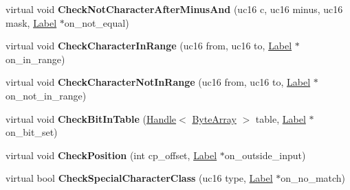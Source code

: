 \begin{DoxyCompactItemize}
\item 
virtual void {\bfseries Check\+Not\+Character\+After\+Minus\+And} (uc16 c, uc16 minus, uc16 mask, \hyperlink{classv8_1_1internal_1_1_label}{Label} $\ast$on\+\_\+not\+\_\+equal)\hypertarget{classv8_1_1internal_1_1_reg_exp_macro_assembler_a_r_m64_a5cee9315b3959c1247ef4aa32a30f36b}{}\label{classv8_1_1internal_1_1_reg_exp_macro_assembler_a_r_m64_a5cee9315b3959c1247ef4aa32a30f36b}

\item 
virtual void {\bfseries Check\+Character\+In\+Range} (uc16 from, uc16 to, \hyperlink{classv8_1_1internal_1_1_label}{Label} $\ast$on\+\_\+in\+\_\+range)\hypertarget{classv8_1_1internal_1_1_reg_exp_macro_assembler_a_r_m64_a8bdf8cecb4e773a87fdfdd53aead5d2c}{}\label{classv8_1_1internal_1_1_reg_exp_macro_assembler_a_r_m64_a8bdf8cecb4e773a87fdfdd53aead5d2c}

\item 
virtual void {\bfseries Check\+Character\+Not\+In\+Range} (uc16 from, uc16 to, \hyperlink{classv8_1_1internal_1_1_label}{Label} $\ast$on\+\_\+not\+\_\+in\+\_\+range)\hypertarget{classv8_1_1internal_1_1_reg_exp_macro_assembler_a_r_m64_af2f36c16eee2658fe7bb92c1e885b365}{}\label{classv8_1_1internal_1_1_reg_exp_macro_assembler_a_r_m64_af2f36c16eee2658fe7bb92c1e885b365}

\item 
virtual void {\bfseries Check\+Bit\+In\+Table} (\hyperlink{classv8_1_1internal_1_1_handle}{Handle}$<$ \hyperlink{classv8_1_1internal_1_1_byte_array}{Byte\+Array} $>$ table, \hyperlink{classv8_1_1internal_1_1_label}{Label} $\ast$on\+\_\+bit\+\_\+set)\hypertarget{classv8_1_1internal_1_1_reg_exp_macro_assembler_a_r_m64_afdef7b32d4a6659e601a74ad3a5a9716}{}\label{classv8_1_1internal_1_1_reg_exp_macro_assembler_a_r_m64_afdef7b32d4a6659e601a74ad3a5a9716}

\item 
virtual void {\bfseries Check\+Position} (int cp\+\_\+offset, \hyperlink{classv8_1_1internal_1_1_label}{Label} $\ast$on\+\_\+outside\+\_\+input)\hypertarget{classv8_1_1internal_1_1_reg_exp_macro_assembler_a_r_m64_ab43f2dad1fca64470f90cef9fdbd8539}{}\label{classv8_1_1internal_1_1_reg_exp_macro_assembler_a_r_m64_ab43f2dad1fca64470f90cef9fdbd8539}

\item 
virtual bool {\bfseries Check\+Special\+Character\+Class} (uc16 type, \hyperlink{classv8_1_1internal_1_1_label}{Label} $\ast$on\+\_\+no\+\_\+match)\hypertarget{classv8_1_1internal_1_1_reg_exp_macro_assembler_a_r_m64_a784e38bb18a948a3e2570e6e0ab32b83}{}\label{classv8_1_1internal_1_1_reg_exp_macro_assembler_a_r_m64_a784e38bb18a948a3e2570e6e0ab32b83}


\end{DoxyCompactItemize}
